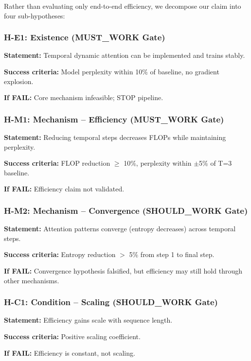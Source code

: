 Rather than evaluating only end-to-end efficiency, we decompose our claim into four sub-hypotheses:

\subsubsection{H-E1: Existence (MUST\_WORK Gate)}

\textbf{Statement:} Temporal dynamic attention can be implemented and trains stably.

\textbf{Success criteria:} Model perplexity within 10\% of baseline, no gradient explosion.

\textbf{If FAIL:} Core mechanism infeasible; STOP pipeline.

\subsubsection{H-M1: Mechanism -- Efficiency (MUST\_WORK Gate)}

\textbf{Statement:} Reducing temporal steps decreases FLOPs while maintaining perplexity.

\textbf{Success criteria:} FLOP reduction $\geq$ 10\%, perplexity within $\pm$5\% of T=3 baseline.

\textbf{If FAIL:} Efficiency claim not validated.

\subsubsection{H-M2: Mechanism -- Convergence (SHOULD\_WORK Gate)}

\textbf{Statement:} Attention patterns converge (entropy decreases) across temporal steps.

\textbf{Success criteria:} Entropy reduction $>$ 5\% from step 1 to final step.

\textbf{If FAIL:} Convergence hypothesis falsified, but efficiency may still hold through other mechanisms.

\subsubsection{H-C1: Condition -- Scaling (SHOULD\_WORK Gate)}

\textbf{Statement:} Efficiency gains scale with sequence length.

\textbf{Success criteria:} Positive scaling coefficient.

\textbf{If FAIL:} Efficiency is constant, not scaling.

